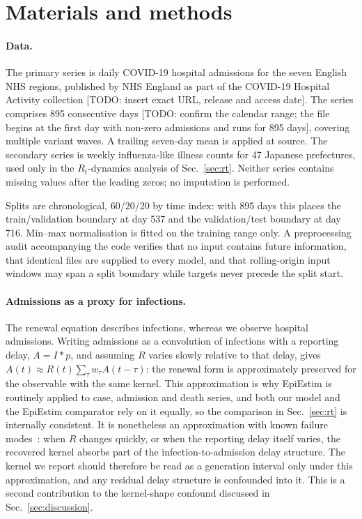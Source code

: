 \documentclass[10pt,letterpaper]{article}
\newcommand{\Rt}{\ensuremath{R_t}\xspace}
\begin{document}
\section{Materials and methods}
\label{sec:methods}

\paragraph{Data.} The primary series is daily COVID-19 hospital admissions
for the seven English NHS regions, published by NHS England as part of the
COVID-19 Hospital Activity collection [TODO: insert exact URL, release and
access date]. The series comprises 895 consecutive days [TODO: confirm the
calendar range; the file begins at the first day with non-zero admissions and
runs for 895 days], covering multiple variant waves. A trailing seven-day mean
is applied at source. The secondary series is weekly influenza-like illness
counts for 47 Japanese prefectures, used only in the \Rt-dynamics analysis of
Sec.~\ref{sec:rt}. Neither series contains missing values after the leading
zeros; no imputation is performed.

Splits are chronological, 60/20/20 by time index: with 895 days this places
the train/validation boundary at day 537 and the validation/test boundary at
day 716. Min--max normalisation is fitted on the training range only. A
preprocessing audit accompanying the code verifies that no input contains
future information, that identical files are supplied to every model, and that
rolling-origin input windows may span a split boundary while targets never
precede the split start.

\paragraph{Admissions as a proxy for infections.} The renewal equation
describes infections, whereas we observe hospital admissions. Writing
admissions as a convolution of infections with a reporting delay,
$A = I \ast p$, and assuming $R$ varies slowly relative to that delay, gives
$A(t)\approx R(t)\sum_\tau w_\tau A(t-\tau)$: the renewal form is approximately
preserved for the observable with the same kernel. This approximation is why
EpiEstim is routinely applied to case, admission and death series, and both our
model and the EpiEstim comparator rely on it equally, so the comparison in
Sec.~\ref{sec:rt} is internally consistent. It is nonetheless an approximation
with known failure modes~\cite{gostic2020practical}: when $R$ changes quickly,
or when the reporting delay itself varies, the recovered kernel absorbs part of
the infection-to-admission delay structure. The kernel we report should
therefore be read as a generation interval only under this approximation, and
any residual delay structure is confounded into it. This is a second
contribution to the kernel-shape confound discussed in Sec.~\ref{sec:discussion}.
\end{document}

